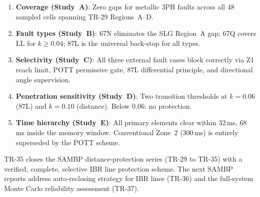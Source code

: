 \documentclass[11pt,a4paper]{article}
\begin{document}
\begin{enumerate}
  \item \textbf{Coverage (Study~A)}: Zero gaps for metallic 3PH faults across
    all 48 sampled cells spanning TR-29 Regions~A--D.

  \item \textbf{Fault types (Study~B)}: 67N eliminates the SLG Region~A gap;
    67Q covers LL for $k\geq0.04$; 87L is the universal back-stop for all types.

  \item \textbf{Selectivity (Study~C)}: All three external fault cases block
    correctly via Z1 reach limit, POTT permissive gate, 87L differential
    principle, and directional angle supervision.

  \item \textbf{Penetration sensitivity (Study~D)}: Two transition thresholds
    at $k=0.06$ (87L) and $k=0.10$ (distance). Below 0.06: no protection.

  \item \textbf{Time hierarchy (Study~E)}: All primary elements clear within
    32\,ms, 68\,ms inside the memory window.  Conventional Zone~2 (300\,ms)
    is entirely superseded by the POTT scheme.
\end{enumerate}

\noindent
TR-35 closes the SAMBP distance-protection series (TR-29 to TR-35) with a
verified, complete, selective IBR line protection scheme.  The next SAMBP
reports address auto-reclosing strategy for IBR lines (TR-36) and the
full-system Monte Carlo reliability assessment (TR-37).



\end{document}
